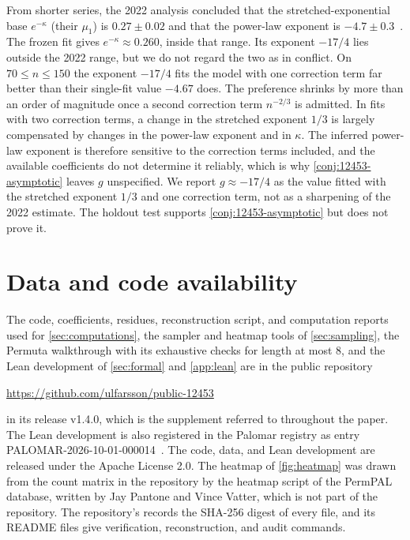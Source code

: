 \documentclass[11pt,reqno]{amsart}
\theoremstyle{definition}
\theoremstyle{remark}
\begin{document}
From shorter series, the 2022 analysis concluded that the
stretched-exponential base $e^{-\kappa}$ (their $\mu_1$) is $0.27\pm0.02$
and that the power-law exponent is
$-4.7\pm0.3$~\cite[Section~10.3]{ClisbyConwayGuttmannInoue2022}.  The frozen
fit gives $e^{-\kappa}\approx0.260$, inside that range.  Its exponent
$-17/4$ lies outside the 2022 range, but we do not regard the two as in
conflict.  On $70\leq n\leq150$ the exponent $-17/4$ fits the model with
one correction term far better than their single-fit value $-4.67$ does.
The preference shrinks by more than an order of magnitude once a second
correction term $n^{-2/3}$ is admitted.  In fits with two correction terms,
a change in the stretched exponent $1/3$ is largely compensated by changes
in the power-law exponent and in $\kappa$.  The inferred power-law exponent
is therefore sensitive to the correction terms included, and the available
coefficients do not determine it reliably, which is why
\cref{conj:12453-asymptotic} leaves $g$ unspecified.  We report
$g\approx-17/4$ as the value fitted with the stretched exponent $1/3$ and
one correction term, not as a sharpening of the 2022 estimate.  The holdout
test supports \cref{conj:12453-asymptotic} but does not prove it.

\section*{Data and code availability}

The code, coefficients, residues, reconstruction script, and computation
reports used for \cref{sec:computations}, the sampler and heatmap tools of
\cref{sec:sampling}, the Permuta walkthrough with its exhaustive checks for
length at most $8$, and the Lean development of \cref{sec:formal} and \cref{app:lean} are in the
public repository
\begin{center}
\url{https://github.com/ulfarsson/public-12453}
\end{center}
\noindent
in its release v1.4.0, which is the supplement referred to throughout the
paper.  The Lean development is also registered in the Palomar registry as
entry PALOMAR-2026-10-01-000014~\cite{PalomarEntry2026}.  The code, data, and
Lean development are released under the Apache License 2.0.  The heatmap of \cref{fig:heatmap} was drawn from the count
matrix in the repository by the heatmap script of the PermPAL database,
written by Jay Pantone and Vince Vatter, which is not part of the
repository.  The repository's
 records the SHA-256 digest of every file, and its README files
give verification, reconstruction, and audit commands.
\end{document}
